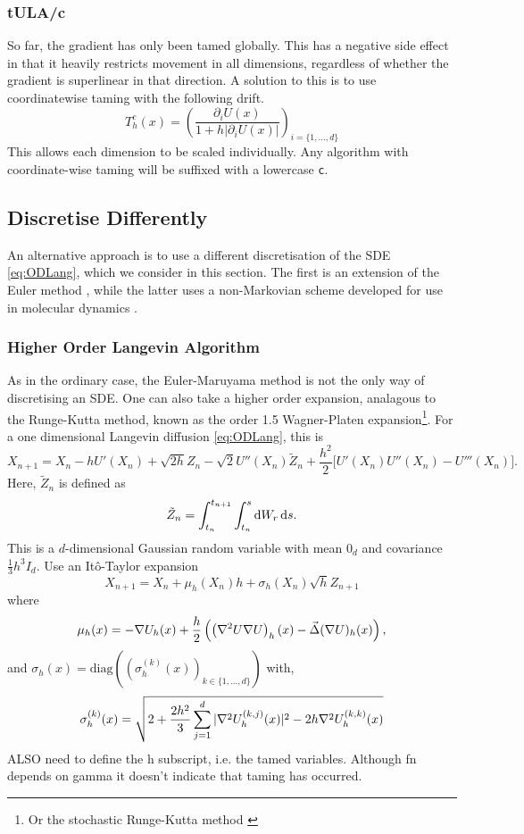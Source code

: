 \subsubsection{tULA/c}
So far, the gradient has only been tamed globally. This has a negative side effect in that it heavily restricts movement in all dimensions, regardless of whether the gradient is superlinear in that direction. A solution to this is to use coordinatewise taming with the following drift.
  \[T^c_{h}(x) =\left(\frac{\partial_i U(x)}{1+h|\partial_i U(x)|}\right)_{i=\lbrace 1, \dots, d\rbrace} \]
This allows each dimension to be scaled individually. Any algorithm with coordinate-wise taming will be suffixed with a lowercase \texttt{c}.

\subsection{Discretise Differently}
An alternative approach is to use a different discretisation of the SDE \eqref{eq:ODLang}, which we consider in this section. The first is an extension of the Euler method \cite{Sabanis18tHOLA}, while the latter uses a non-Markovian scheme developed for use in molecular dynamics \cite{LM12}.
\subsubsection{Higher Order Langevin Algorithm}
As in the ordinary case, the Euler-Maruyama method is not the only way of discretising an SDE. One can also take a higher order expansion, analagous to the Runge-Kutta method, known as the order 1.5 Wagner-Platen expansion\footnote{Or the stochastic Runge-Kutta method \cite{Schaffter10numericalintegration}}. For a one dimensional Langevin diffusion \eqref{eq:ODLang}, this is 
\[X_{n+1} = X_n -hU'(X_n)+\sqrt{2h}Z_n -\sqrt{2} U''(X_n) \tilde{Z}_n +\frac{ h^2 }{2}\bigg\lbrack U'(X_n)U''(X_n)-U'''(X_n)\bigg\rbrack.  \]
Here, \(\tilde{Z}_n\) is defined as
\[  \tilde{Z}_n = \int_{t_n}^{t_{n+1}} \int_{t_n}^s \mathop{}\!\mathrm{d} W_r \mathop{}\!\mathrm{d} s. \]
This is a \(d\)-dimensional Gaussian random variable with mean \(0_d\) and covariance \(\frac{1}{3}h^3 I_d\). 
Use an It\^o-Taylor expansion
\[X_{n+1} = X_n + \mu_{h}(X_n)h +\sigma_{h}(X_n)\sqrt{h}Z_{n+1}\]
where
\[\mu_{h}(x) = -\nabla U_{h}(x) +\frac{h}{2}\left( \left( \nabla^2U\nabla U\right)_{h}(x) - \vec{\Delta}(\nabla U)_{h}(x)\right) ,\]
and \(\sigma_{h}(x) = \text{diag}\left(\left( \sigma_{h}^{(k)}(x)\right)_{k\in \lbrace 1,\dots,d\rbrace}\right)\) with,
\[\sigma_{h}^{(k)}(x) = \sqrt{2+\frac{2h^2}{3}\sum_{j=1}^d |\nabla^2 U_{h}^{(k,j)}(x)|^2 - 2h \nabla^2 U_{h}^{(k,k)}(x)}\]
ALSO need to define the h subscript, i.e. the tamed variables.  Although fn depends on gamma it doesn't indicate that taming has occurred.
